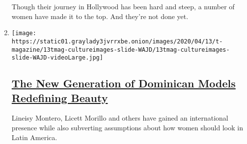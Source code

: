 \begin{enumerate}
  Though their journey in Hollywood has been hard and steep, a number of
  women have made it to the top. And they're not done yet.
\item
  \texttt{[image: https://static01.graylady3jvrrxbe.onion/images/2020/04/13/t-magazine/13tmag-cultureimages-slide-WAJD/13tmag-cultureimages-slide-WAJD-videoLarge.jpg]}

  \hypertarget{the-new-generation-of-dominican-models-redefining-beauty}{%
  \subsection{\texorpdfstring{\href{/interactive/2020/04/13/t-magazine/dominican-republic-models.html}{The
  New Generation of Dominican Models Redefining
  Beauty}}{The New Generation of Dominican Models Redefining Beauty}}\label{the-new-generation-of-dominican-models-redefining-beauty}}

  Lineisy Montero, Licett Morillo and others have gained an
  international presence while also subverting assumptions about how
  women should look in Latin America.
\end{enumerate}

